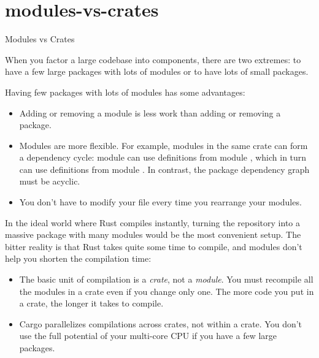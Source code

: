 \documentclass{article}
\begin{document}
\begin{description}
\end{description}

\section{modules-vs-crates}{Modules vs Crates}

When you factor a large codebase into components, there are two extremes:
to have a few large packages with lots of modules or
to have lots of small packages.

Having few packages with lots of modules has some advantages:
\begin{itemize}
  \item 
    Adding or removing a module is less work than adding or removing a package.
  \item 
    Modules are more flexible.
    For example, modules in the same crate can form a dependency cycle: module  can use definitions from module , which in turn can use definitions from module .
    In contrast, the package dependency graph must be acyclic.
  \item 
    You don't have to modify your  file every time you rearrange your modules.
\end{itemize}

In the ideal world where Rust compiles instantly, turning the repository into a massive package with many modules would be the most convenient setup.
The bitter reality is that Rust takes quite some time to compile, and modules don't help you shorten the compilation time:
\begin{itemize}
\item 
  The basic unit of compilation is a \emph{crate}, not a \emph{module}.
  You must recompile all the modules in a crate even if you change only one.
  The more code you put in a crate, the longer it takes to compile.
\item 
  Cargo parallelizes compilations across crates, not within a crate.
  You don't use the full potential of your multi-core CPU if you have a few large packages.
\end{itemize}
\end{document}
